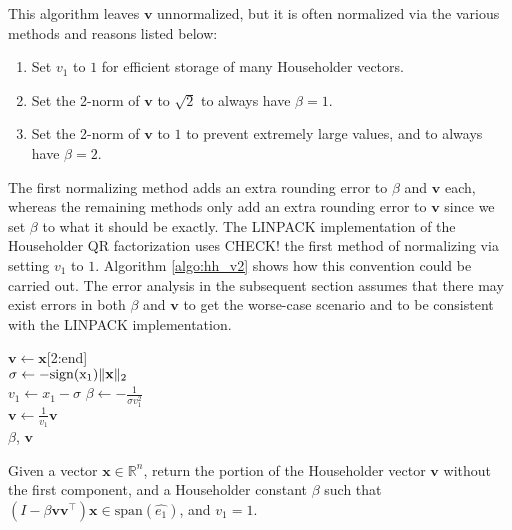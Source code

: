 \documentclass{article}
\newcommand{\R}{\mathbb{R}}
\newcommand{\bb}[1]{\mathbf{#1}}
\theoremstyle{definition}
\begin{document}
This algorithm leaves $\bb{v}$ unnormalized, but it is often normalized via the various methods and reasons listed below:
\begin{enumerate}
    \item Set $v_1$ to $1$ for efficient storage of many Householder vectors.
    \item Set the 2-norm of $\bb{v}$ to $\sqrt{2}$ to always have $\beta=1$.
    \item Set the 2-norm of $\bb{v}$ to $1$ to prevent extremely large values, and to always have $\beta=2$.
\end{enumerate}
The first normalizing method adds an extra rounding error to $\beta$ and $\bb{v}$ each, whereas the remaining methods only add an extra rounding error to $\bb{v}$ since we set $\beta$ to what it should be exactly. 
The LINPACK implementation of the Householder QR factorization uses {\color{blue}CHECK!} the first method of normalizing via setting $v_1$ to $1$. 
Algorithm \ref{algo:hh_v2} shows how this convention could be carried out. 
The error analysis in the subsequent section assumes that there may exist errors in both $\beta$ and $\bb{v}$ to get the worse-case scenario and to be consistent with the LINPACK implementation. 
\begin{algorithm}
	\DontPrintSemicolon %
	\KwIn{$\bb{x}\in\R^n$}
	\KwOut{$\bb{v}\in\R^n$, and $\sigma, \beta\in\R$ such that $(I-\beta \bb{v}\bb{v}^{\top})\bb{x} = \pm \|\bb{x}\|_2 \hat{e_1} = \sigma\hat{e_1}$ }
	$\bb{v}\gets \bb{x}$[2:end]\\
	$\sigma \gets -\rm{sign}(x_1)\|\bb{x}\|_2$\\
	$v_1 \gets x_1-\sigma$  
	$\beta \gets -\frac{1}{\sigma v_1^2}$\\
	$\bb{v} \gets \frac{1}{v_1}\bb{v}$\\
	\Return $\beta$, $\bb{v}$
	\caption{Given a vector $\bb{x}\in\R^n$, return the portion of the Householder vector $\bb{v}$ without the first component, and a Householder constant $\beta$ such that $(I-\beta \bb{v}\bb{v}^{\top})\bb{x} \in \mathrm{span}(\hat{e_1})$, and $v_1=1$.}
	\label{algo:hh_v2}
\end{algorithm}
\end{document}
